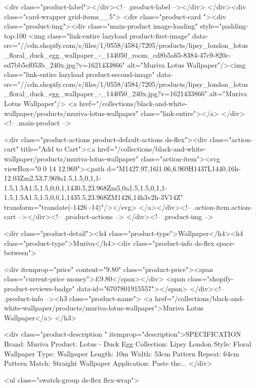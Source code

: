 {{{{{{{<div class="product-label"></div><!-- .product-label --></div>
          </div><div class="card-wrapper grid-items__5">
            <div class="product-card "><div class="product-img"><div class="main-product image-loading" style="padding-top:100%
      <img class="link-entire lazyload product-first-image" data-src="//cdn.shopify.com/s/files/1/0558/4584/7205/products/lipsy_london_lotus_floral_duck_egg_wallpaper_-_144050_room_cd8b5a65-8384-47c9-820c-ed7bb5ef053b_240x.jpg?v=1621433866" alt="Muriva Lotus Wallpaper"/><img class="link-entire lazyload product-second-image" data-src="//cdn.shopify.com/s/files/1/0558/4584/7205/products/lipsy_london_lotus_floral_duck_egg_wallpaper_-_144050_240x.jpg?v=1621433866" alt="Muriva Lotus Wallpaper"/>
      <a href="/collections/black-and-white-wallpaper/products/muriva-lotus-wallpaper" class="link-entire"></a>
    </div><!-- .main-product -->
  
<div class="product-actions product-default-actions ds-flex"><div class="action-cart" title="Add to Cart"><a href="/collections/black-and-white-wallpaper/products/muriva-lotus-wallpaper" class="action-item"><svg viewBox="0 0 14 12.969"><path d="M1427.97,16l1.06,6.969H1437L1440,16h-12.03Zm2.53,7.969a1.5,1.5,0,1,1-1.5,1.5A1.5,1.5,0,0,1,1430.5,23.968Zm5,0a1.5,1.5,0,1,1-1.5,1.5A1.5,1.5,0,0,1,1435.5,23.968ZM1426,14h3v2h-3V14Z" transform="translate(-1426 -14)"/></svg>
</a></div><!-- .action-item.action-cart --></div><!-- .product-actions -->
</div><!-- .product-img -->

<div class="product-detail"><h4 class="product-type">Wallpaper</h4><h4 class="product-type">Muriva</h4><div class="product-info ds-flex space-between">
    
<div itemprop="price" content="9.80" class="product-price"><span class="current-price money">£9.80</span></div>
    <span class="shopify-product-reviews-badge" data-id="6707801915557"></span>
  </div><!-- .product-info --><h3 class="product-name">
      <a href="/collections/black-and-white-wallpaper/products/muriva-lotus-wallpaper">Muriva Lotus Wallpaper</a>
    </h3>
    
<div class="product-description " itemprop="description">SPECIFICATION Brand: Muriva Product: Lotus - Duck Egg Collection: Lipsy London Style: Floral Wallpaper Type: Wallpaper Length: 10m Width: 53cm Pattern Repeat: 64cm Pattern Match: Straight Wallpaper Application: Paste the...
</div>



<ul class="swatch-group ds-flex flex-wrap">
        
}}}}}}}
